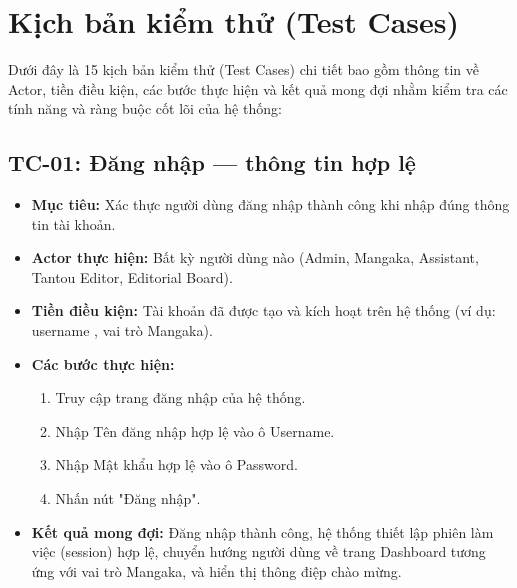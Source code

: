 \section{Kịch bản kiểm thử (Test Cases)}
\label{sec:test_cases}

Dưới đây là 15 kịch bản kiểm thử (Test Cases) chi tiết bao gồm thông tin về Actor, tiền điều kiện, các bước thực hiện và kết quả mong đợi nhằm kiểm tra các tính năng và ràng buộc cốt lõi của hệ thống:

\subsection{TC-01: Đăng nhập — thông tin hợp lệ}
\label{subsec:tc01_login_valid}
\begin{itemize}
    \item \textbf{Mục tiêu:} Xác thực người dùng đăng nhập thành công khi nhập đúng thông tin tài khoản.
    \item \textbf{Actor thực hiện:} Bất kỳ người dùng nào (Admin, Mangaka, Assistant, Tantou Editor, Editorial Board).
    \item \textbf{Tiền điều kiện:} Tài khoản đã được tạo và kích hoạt trên hệ thống (ví dụ: username , vai trò Mangaka).
    \item \textbf{Các bước thực hiện:}
    \begin{enumerate}
        \item Truy cập trang đăng nhập của hệ thống.
        \item Nhập Tên đăng nhập hợp lệ vào ô Username.
        \item Nhập Mật khẩu hợp lệ vào ô Password.
        \item Nhấn nút "Đăng nhập".
    \end{enumerate}
    \item \textbf{Kết quả mong đợi:} Đăng nhập thành công, hệ thống thiết lập phiên làm việc (session) hợp lệ, chuyển hướng người dùng về trang Dashboard tương ứng với vai trò Mangaka, và hiển thị thông điệp chào mừng.
\end{itemize}

